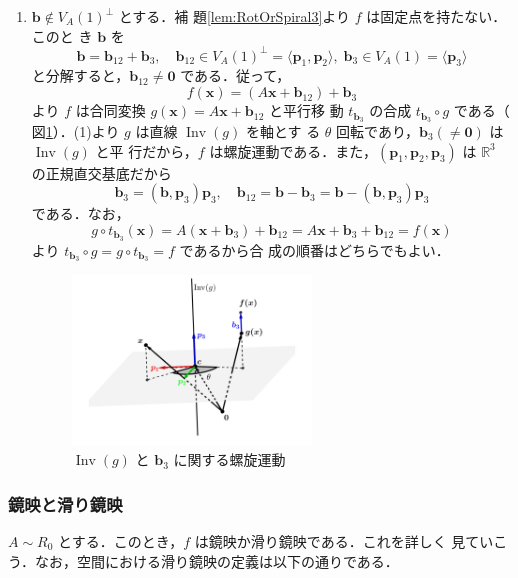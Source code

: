\documentclass[11pt, uplatex, dvipdfmx, titlepage]{jsarticle}
\makeatletter
\DeclareMathOperator{\Inv}{Inv}
\renewenvironment{proof}[1][\proofname]{\par
  \pushQED{\qed}%
  \normalfont \topsep6\p@\@plus6\p@\relax
  \trivlist
  \item[\hskip\labelsep
         \bfseries
    {#1}]\ignorespaces
}{%
  \popQED\endtrivlist\@endpefalse
}
\theoremstyle{definition}
\renewcommand{\proofname}{\textbf{証明}}
\makeatother
\begin{document}
\begin{proof}[定理\ref{thm:RotOrSpiral3}の証明]
\begin{enumerate}[(1)]
  \item $\bm{b} \notin V_A(1)^{\perp}$ とする．補
    題\ref{lem:RotOrSpiral3}より $f$ は固定点を持たない．このと
    き $\bm{b}$ を
    \[
      \bm{b} = \bm{b}_{12} + \bm{b}_3 , \quad \bm{b}_{12} \in
      V_A(1)^{\perp}=\langle \bm{p}_1, \bm{p}_2 \rangle, \; \bm{b}_{3} \in
      V_A(1)=\langle \bm{p}_3\rangle
    \]
    と分解すると，$\bm{b}_{12} \neq \bm{0}$ である．従って，
    \[
      f(\bm{x}) = \left( A\bm{x} + \bm{b}_{12}\right) + \bm{b}_3
    \]
    より $f$ は合同変換 $g(\bm{x}) = A\bm{x} + \bm{b}_{12}$ と平行移
    動 $t_{\bm{b}_3}$ の合成 $t_{\bm{b}_{3}} \circ g$ である（
    図\ref{fig:spiral3}）．(1)より $g$ は直線 $\Inv(g)$ を軸とす
    る $\theta$ 回転であり，$\bm{b}_3 (\neq \bm{0})$ は $\Inv(g)$ と平
    行だから，$f$ は螺旋運動である．また，$(\bm{p}_1, \bm{p}_2,
    \bm{p}_3)$ は $\mathbb{R}^3$ の正規直交基底だから
    \[
      \bm{b}_{3} = (\bm{b}, \bm{p}_3) \bm{p}_3,\quad \bm{b}_{12} =
      \bm{b}-\bm{b}_{3} = \bm{b} - (\bm{b},\bm{p}_3)\bm{p}_3
    \]
    である．なお，
    \[
      g \circ t_{\bm{b}_3} (\bm{x}) = A(\bm{x} + \bm{b}_3) + \bm{b}_{12} =
      A\bm{x} + \bm{b}_3 + \bm{b}_{12} = f(\bm{x})
    \]
    より $t_{\bm{b}_3} \circ g = g \circ t_{\bm{b}_3} = f$ であるから合
    成の順番はどちらでもよい．
    \begin{figure}[h]
      \centering
      \includegraphics[height=4.5cm]{pictures/spiral3.pdf}
      \caption{$\Inv(g)$ と $\bm{b}_3$ に関する螺旋運動}
      \label{fig:spiral3}
    \end{figure}
  \end{enumerate}
\end{proof}

\subsubsection{鏡映と滑り鏡映}\label{sec:RefGlide3}

$A \sim R_0$ とする．このとき，$f$ は鏡映か滑り鏡映である．これを詳しく
見ていこう．なお，空間における滑り鏡映の定義は以下の通りである．
\end{document}
